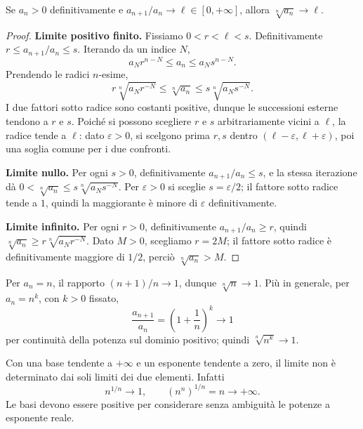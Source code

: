 \begin{proposizione}
\label{prop:rapporto-radice}
Se $a_n>0$ definitivamente e $a_{n+1}/a_n\to\ell\in[0,+\infty]$, allora $\sqrt[n]{a_n}\to\ell$.
\end{proposizione}
\begin{proof}
\textbf{Limite positivo finito.} Fissiamo $0<r<\ell<s$. Definitivamente $r\le a_{n+1}/a_n\le s$. Iterando da un indice $N$,
\[
a_Nr^{n-N}\le a_n\le a_Ns^{n-N}.
\]
Prendendo le radici $n$-esime,
\[
r\sqrt[n]{a_Nr^{-N}}\le\sqrt[n]{a_n}\le s\sqrt[n]{a_Ns^{-N}}.
\]
I due fattori sotto radice sono costanti positive, dunque le successioni esterne tendono a $r$ e $s$. Poiché si possono scegliere $r$ e $s$ arbitrariamente vicini a $\ell$, la radice tende a $\ell$: dato $\varepsilon>0$, si scelgono prima $r,s$ dentro $(\ell-\varepsilon,\ell+\varepsilon)$, poi una soglia comune per i due confronti.

\textbf{Limite nullo.} Per ogni $s>0$, definitivamente $a_{n+1}/a_n\le s$, e la stessa iterazione dà $0<\sqrt[n]{a_n}\le s\sqrt[n]{a_Ns^{-N}}$. Per $\varepsilon>0$ si sceglie $s=\varepsilon/2$; il fattore sotto radice tende a $1$, quindi la maggiorante è minore di $\varepsilon$ definitivamente.

\textbf{Limite infinito.} Per ogni $r>0$, definitivamente $a_{n+1}/a_n\ge r$, quindi $\sqrt[n]{a_n}\ge r\sqrt[n]{a_Nr^{-N}}$. Dato $M>0$, scegliamo $r=2M$; il fattore sotto radice è definitivamente maggiore di $1/2$, perciò $\sqrt[n]{a_n}>M$.
\end{proof}

\begin{esempio}
Per $a_n=n$, il rapporto $(n+1)/n\to1$, dunque $\sqrt[n]{n}\to1$. Più in generale, per $a_n=n^k$, con $k>0$ fissato,
\[
\frac{a_{n+1}}{a_n}=\left(1+\frac1n\right)^k\longrightarrow1
\]
per continuità della potenza sul dominio positivo; quindi $\sqrt[n]{n^k}\to1$.
\end{esempio}

\begin{osservazione}
Con una base tendente a $+\infty$ e un esponente tendente a zero, il limite non è determinato dai soli limiti dei due elementi. Infatti
\[
n^{1/n}\longrightarrow1,
\qquad
(n^n)^{1/n}=n\longrightarrow+\infty.
\]
Le basi devono essere positive per considerare senza ambiguità le potenze a esponente reale.
\end{osservazione}
